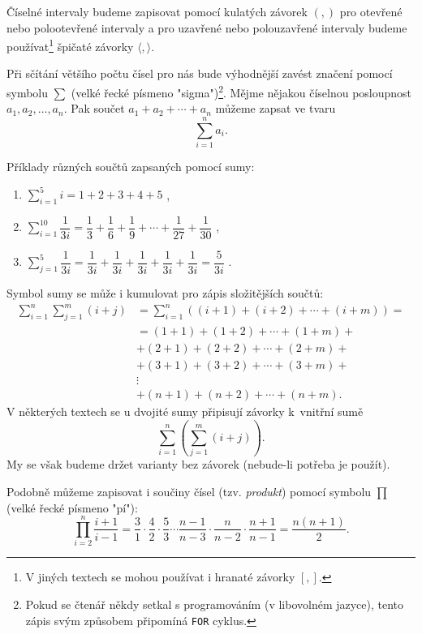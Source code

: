 Číselné intervaly budeme zapisovat pomocí kulatých závorek $(,)$ pro otevřené nebo polootevřené intervaly a pro uzavřené nebo polouzavřené intervaly budeme používat\footnote{V jiných textech se mohou používat i hranaté závorky $[,]$.} špičaté závorky $\langle,\rangle$.\par
\medskip
Při sčítání většího počtu čísel pro nás bude výhodnější zavést značení pomocí symbolu $\sum$ (velké řecké písmeno "sigma")\footnote{Pokud se čtenář někdy setkal s programováním (v libovolném jazyce), tento zápis svým způsobem připomíná \texttt{FOR} cyklus.}. Mějme nějakou číselnou posloupnost $a_1,a_2,\dots,a_n$. Pak součet $a_1+a_2+\cdots+a_n$ můžeme zapsat ve tvaru
\begin{equation*}
    \sum_{i=1}^{n}{a_i}.
\end{equation*}
\begin{example}\label{ex:uziti_sum}
    Příklady různých součtů zapsaných pomocí sumy:
    \begin{enumerate}[label=(\roman*)]
        \item $\displaystyle \sum_{i=1}^{5}{i}=1+2+3+4+5$ ,
        \item $\displaystyle \sum_{i=1}^{10}{\dfrac{1}{3i}}=\dfrac{1}{3}+\dfrac{1}{6}+\dfrac{1}{9}+\cdots+\dfrac{1}{27}+\dfrac{1}{30}$ ,
        \item $\displaystyle \sum_{j=1}^{5}{\dfrac{1}{3i}}=\dfrac{1}{3i}+\dfrac{1}{3i}+\dfrac{1}{3i}+\dfrac{1}{3i}+\dfrac{1}{3i}=\dfrac{5}{3i}$ .
    \end{enumerate}
\end{example}
Symbol sumy se může i kumulovat pro zápis složitějších součtů:
\begin{align*}
    \sum_{i=1}^{n}{\sum_{j=1}^{m}{(i+j)}}&=\sum_{i=1}^{n}{\left((i+1)+(i+2)+\cdots+(i+m)\right)}=\\
    &=(1+1)+(1+2)+\cdots+(1+m)+\\
    &+(2+1)+(2+2)+\cdots+(2+m)+\\
    &+(3+1)+(3+2)+\cdots+(3+m)+\\
    &\vdots\\
    &+(n+1)+(n+2)+\cdots+(n+m).
\end{align*}
V některých textech se u dvojité sumy připisují závorky k~vnitřní sumě
\begin{equation*}
    \sum_{i=1}^{n}{\left(\sum_{j=1}^{m}{(i+j)}\right)}.
\end{equation*}
My se však budeme držet varianty bez závorek (nebude-li potřeba je použít).\par
Podobně můžeme zapisovat i součiny čísel (tzv. \emph{produkt}) pomocí symbolu $\prod$ (velké řecké písmeno "pí"):
\begin{equation*}
    \prod_{i=2}^{n}{\dfrac{i+1}{i-1}}=\dfrac{3}{1}\cdot\dfrac{4}{2}\cdot\dfrac{5}{3}\cdots\dfrac{n-1}{n-3}\cdot\dfrac{n}{n-2}\cdot\dfrac{n+1}{n-1}=\dfrac{n(n+1)}{2}.
\end{equation*}

